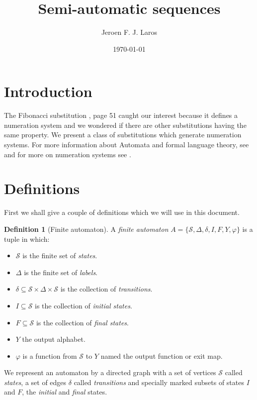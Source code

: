 \documentclass{article}
\title{\Huge{Semi-automatic sequences}}
\author{Jeroen F. J. Laros}
\date{\today}
\theoremstyle{definition}
\newtheorem{definition}[theorem]{Definition}
\begin{document}
\maketitle
\newpage

\tableofcontents
\newpage

\section{Introduction}
The Fibonacci substitution \cite{Fogg}, page 51 caught our interest because it 
defines a numeration system and we wondered if there are other substitutions 
having the same property. We present a class of substitutions which generate 
numeration systems. For more information about Automata and formal language
theory, see \cite{Wood} and for more on numeration systems see \cite{Loth}.

\section{Definitions}
First we shall give a couple of definitions which we will use in this document.

\begin{definition}[Finite automaton] \label{def:automaton}
A \emph{finite automaton} 
$A = \{\mathcal{S}, \Delta, \delta, I, F, Y, \varphi\}$ is a tuple in which:
\begin{itemize}
\item $\mathcal{S}$ is the finite set of \emph{states}.
\item $\Delta$ is the finite set of \emph{labels}.
\item $\delta \subseteq \mathcal{S} \times \Delta \times \mathcal{S}$ is the
      collection of \emph{transitions}.
\item $I \subseteq \mathcal{S}$ is the collection of \emph{initial states}.
\item $F \subseteq \mathcal{S}$ is the collection of \emph{final states}.
\item $Y$ the output alphabet.
\item $\varphi$ is a function from $\mathcal{S}$ to $Y$ named the output
      function or exit map.
\end{itemize}
\end{definition}

We represent an automaton by a directed graph with a set of vertices
$\mathcal{S}$ called \emph{states}, a set of edges $\delta$ called
\emph{transitions} and specially marked subsets of states $I$ and $F$, the
\emph{initial} and \emph{final} states.
\end{document}
